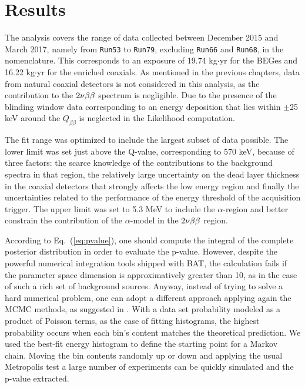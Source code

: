 \section{Results}\label{sec:results}
The analysis covers the range of data collected between December 2015 and March 2017, namely from \texttt{Run53} to \texttt{Run79}, excluding \texttt{Run66} and \texttt{Run68}, in the {\gerda} nomenclature. This corresponds to an exposure of 19.74 kg$\cdot$yr for the BEGes and 16.22 kg$\cdot$yr for the enriched coaxials. As mentioned in the previous chapters, data from natural coaxial detectors is not considered in this analysis, as the contribution to the $2\nu\beta\beta$ spectrum is negligible. Due to the presence of the blinding window data corresponding to an energy deposition that lies within $\pm$25 keV around the $Q_{\beta\beta}$ is neglected in the Likelihood computation.

The fit range was optimized to include the largest subset of data possible. The lower limit was set just above the  Q-value, corresponding to 570 keV, because of three factors: the scarce knowledge of the contributions to the background spectra in that region, the relatively large uncertainty on the dead layer thickness in the coaxial detectors that strongly affects the low energy region and finally the uncertainties related to the performance of the energy threshold of the acquisition trigger. The upper limit was set to 5.3 MeV to include the $\alpha$-region and better constrain the contribution of the $\alpha$-model in the $2\nu\beta\beta$ region.

 According to Eq.~(\ref{eq:pvalue}), one should compute the integral of the complete posterior distribution in order to evaluate the p-value. However, despite the powerful numerical integration tools shipped with BAT, the calculation fails if the parameter space dimension is approximatively greater than 10, as in the case of such a rich set of background sources. Anyway, instead of trying to solve a hard numerical problem, one can adopt a different approach applying again the MCMC methods, as suggested in \cite{p-value}. With a data set probability modeled as a product of Poisson terms, as the case of fitting histograms, the highest probability occurs when each bin's content matches the theoretical prediction. We used the best-fit energy histogram to define the starting point for a Markov chain. Moving the bin contents randomly up or down and applying the usual Metropolis test a large number of experiments can be quickly simulated and the p-value extracted.

